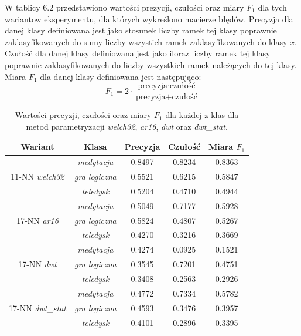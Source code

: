\documentclass[notitlepage]{report}
\begin{document}
W tablicy 6.2 przedstawiono wartości prezycji, czułości oraz miary $F_1$ dla tych wariantow eksperymentu, dla których wykreślono macierze błędów. Precyzja dla danej klasy definiowana jest jako stosunek liczby ramek tej klasy poprawnie zaklasyfikowanych do sumy liczby wszystich ramek zaklasyfikowanych do klasy $x$. Czułość dla danej klasy definiowana jest jako iloraz liczby ramek tej klasy poprawnie zaklasyfikowanych do liczby wszystkich ramek należących do tej klasy. Miara $F_1$ dla danej klasy definiowana jest następująco: 
\begin{equation}
F_1 = 2 \cdot \frac{\text{precyzja} \cdot \text{czułość}}{\text{precyzja}+\text{czułość}} 
\end{equation}

 \begin{table}[H]
	\centering
	\small
	\setlength\tabcolsep{2pt}
	\begin{tabular}{| c | c | c | c | c |}
		\hline
		Wariant & Klasa & Precyzja  & Czułość & Miara $F_1$ \\ \hline
		\multirow{3}{*}{11-NN \textit{welch32}} & \textit{medytacja} & 0.8497 & 0.8234 & 0.8363  \\ 
		& \textit{gra logiczna} & 0.5521 & 0.6215 & 0.5847  \\ 
		& \textit{teledysk} & 0.5204 & 0.4710 & 0.4944 \\ \hline
		\multirow{3}{*}{17-NN \textit{ar16}} & \textit{medytacja} & 0.5049 & 0.7177 & 0.5928 \\
		& \textit{gra logiczna} & 0.5824 & 0.4807 & 0.5267\\
		& \textit{teledysk} & 0.4270 & 0.3216 & 0.3669\\ \hline
		\multirow{3}{*}{17-NN \textit{dwt}} & \textit{medytacja} & 0.4274 & 0.0925 & 0.1521 \\
		& \textit{gra logiczna} & 0.3545 & 0.7201 & 0.4751\\
		& \textit{teledysk} & 0.3408 & 0.2563 & 0.2926\\ \hline
		\multirow{3}{*}{17-NN \textit{dwt\_stat}} & \textit{medytacja} & 0.4772 & 0.7334 & 0.5782 \\
		& \textit{gra logiczna} & 0.4593 & 0.3476 & 0.3957\\
		& \textit{teledysk} & 0.4101 & 0.2896 & 0.3395\\ \hline
	\end{tabular}
	\caption{Wartości precyzji, czułości oraz miary $F_1$ dla każdej z klas dla metod parametryzacji \textit{welch32}, \textit{ar16}, \textit{dwt} oraz \textit{dwt\_stat}.}
\end{table} 
\end{document}
